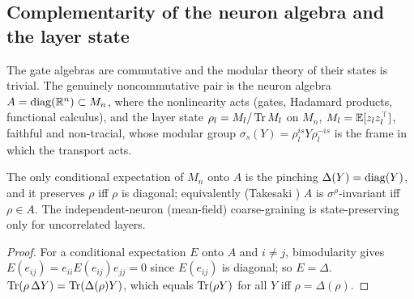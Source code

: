 \subsection{Complementarity of the neuron algebra and the layer state}\label{sec:complement}
The gate algebras are commutative and the modular theory of their states is trivial. The genuinely noncommutative
pair is the neuron algebra $A=\operatorname{diag}(\mathbb R^n)\subset M_n$, where the nonlinearity acts (gates, Hadamard products,
functional calculus), and the layer state $\rho_l=M_l/\operatorname{Tr} M_l$ on $M_n$, $M_l=\mathbb E[z_lz_l^{\top}]$, faithful and
non-tracial, whose modular group $\sigma_s(Y)=\rho_l^{is}Y\rho_l^{-is}$ is the frame in which the transport acts.

\begin{proposition}\label{prop:takesaki}
The only conditional expectation of $M_n$ onto $A$ is the pinching $\Delta(Y)=\operatorname{diag}(Y)$, and it preserves $\rho$ iff
$\rho$ is diagonal; equivalently (Takesaki \cite{Tak}) $A$ is $\sigma^\rho$-invariant iff $\rho\in A$. The independent-neuron
(mean-field) coarse-graining is state-preserving only for uncorrelated layers.
\end{proposition}
\begin{proof}
For a conditional expectation $E$ onto $A$ and $i\neq j$, bimodularity gives $E(e_{ij})=e_{ii}E(e_{ij})e_{jj}=0$ since
$E(e_{ij})$ is diagonal; so $E=\Delta$. $\operatorname{Tr}(\rho\,\Delta Y)=\operatorname{Tr}(\Delta(\rho)Y)$, which equals $\operatorname{Tr}(\rho Y)$ for all $Y$ iff
$\rho=\Delta(\rho)$.
\end{proof}


